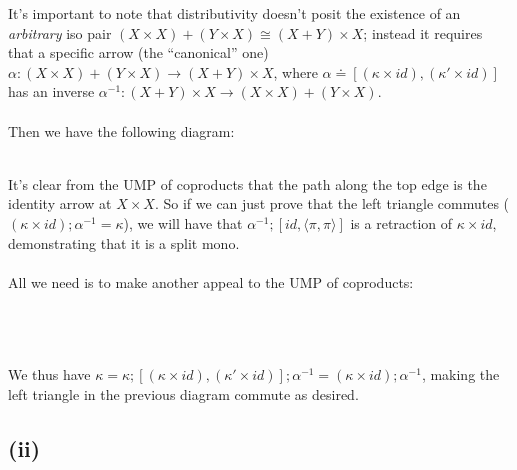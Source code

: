 \documentclass{article}
\begin{document}
It's important to note that distributivity doesn't posit the existence of an \emph{arbitrary} iso pair 
$(X \times X) + (Y \times X) \cong (X + Y) \times X$; instead it requires that a specific arrow (the ``canonical'' one)
$\alpha : (X \times X) + (Y \times X) \to (X + Y) \times X$, where 
$\alpha \doteq [(\kappa \times id), (\kappa' \times id)]$ has an inverse $\alpha^{-1} : (X  + Y) \times X \to (X \times X) + (Y \times X)$.\\~\\
Then we have the following diagram:\\~\\

It's clear from the UMP of coproducts that the path along the top edge is the identity arrow at $X \times X$.
So if we can just prove that the left triangle commutes ($(\kappa \times id);\alpha^{-1} = \kappa$), 
we will have that $\alpha^{-1};[id,\langle \pi,\pi\rangle]$ is a retraction of $\kappa \times id$,
demonstrating that it is a split mono.\\~\\
All we need is to make another appeal to the UMP of coproducts:\\~\\
\\~\\
We thus have $\kappa = \kappa;[(\kappa \times id), (\kappa' \times id)];\alpha^{-1} = (\kappa \times id);\alpha^{-1}$,
making the left triangle in the previous diagram commute as desired.

\subsection*{(ii)}
\end{document}
